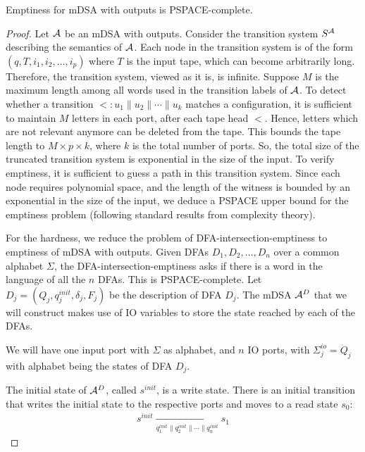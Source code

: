 
\begin{theorem}
Emptiness for mDSA with outputs is PSPACE-complete.
\end{theorem}
\begin{proof}
    Let $\mathcal{A}$ be an mDSA with outputs. Consider the transition system $S^{\mathcal{A}}$ describing the semantics of $\mathcal{A}$. Each node in the transition system is of the form $(q, T, i_1, i_2, \dots, i_p)$ where $T$ is the input tape, which can become arbitrarily long. Therefore, the transition system, viewed as it is, is infinite. Suppose $M$ is the maximum length among all words used in the transition labels of $\mathcal{A}$. To detect whether a transition $\lt: u_1 \parallel u_2 \parallel \cdots \parallel u_k$ matches a configuration, it is sufficient to maintain $M$ letters in each port, after each tape head $\lt$. Hence, letters which are not relevant anymore can be deleted from the tape. This bounds the tape length to $M \times p \times k$, where $k$ is the total number of ports. So, the total size of the truncated transition system is exponential in the size of the input. To verify emptiness, it is sufficient to guess a path in this transition system. Since each node requires polynomial space, and the length of the witness is bounded by an exponential in the size of the input, we deduce a PSPACE upper bound for the emptiness problem (following standard results from complexity theory).

    For the hardness, we reduce the problem of DFA-intersection-emptiness  to emptiness of mDSA with outputs. Given DFAs $D_1, D_2, \dots, D_n$ over a common alphabet $\Sigma$, the DFA-intersection-emptiness asks if there is a word in the language of all the $n$ DFAs. This is PSPACE-complete. Let $D_j = (Q_j, q^{init}_j, \delta_j, F_j)$ be the description of DFA $D_j$. The mDSA $\mathcal{A}^D$ that we will construct makes use of IO variables to store the state reached by each of the DFAs.

    We will have one input port with $\Sigma$ as alphabet, and $n$ IO ports, with $\Sigma^{io}_j = Q_j$ with alphabet being the states of DFA $D_j$.

    The initial state of $\mathcal{A}^D$, called $s^{init}$, is a write state. There is an initial transition that writes the initial state to the respective ports and moves to  a read state $s_0$:
    \begin{align*}
    s^{init} \xrightarrow[q^{init}_1 \parallel q^{init}_2 \parallel \cdots \parallel q^{init}_n]{} s_1
    \end{align*}


\end{proof}
